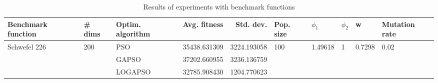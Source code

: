 \begin{table}
\centering
\caption{Results of experiments with benchmark functions}
\begin{tabular}{lllrrlllll}
\toprule
           Benchmark function &              \# dims & Optim. algorithm &  Avg. fitness &   Std. dev. &            Pop. size &               $\phi_{1}$ &         $\phi_{2}$ &                       w &         Mutation rate \\
\midrule
\multirow{3}{*}{Schwefel 226} & \multirow{3}{*}{200} &              PSO &  35438.631309 & 3224.193058 & \multirow{3}{*}{100} & \multirow{3}{*}{1.49618} & \multirow{3}{*}{1} & \multirow{3}{*}{0.7298} & \multirow{3}{*}{0.02} \\
                              &                      &            GAPSO &  37202.660955 & 3236.136759 &                      &                          &                    &                         &                       \\
                              &                      &          LOGAPSO &  32785.908430 & 1204.770623 &                      &                          &                    &                         &                       \\
\bottomrule
\end{tabular}
\end{table}
